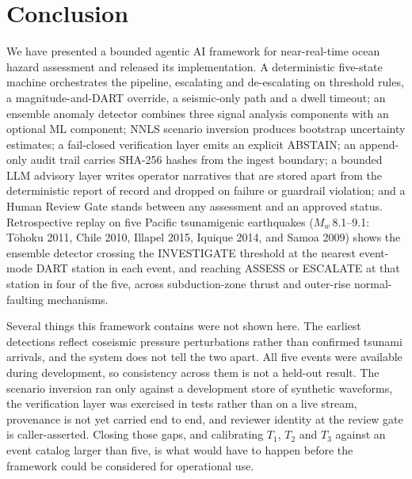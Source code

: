 \documentclass{article}
\begin{document}

\section{Conclusion}

We have presented a bounded agentic AI framework for near-real-time
ocean hazard assessment and released its implementation.  A
deterministic five-state machine orchestrates the pipeline, escalating
and de-escalating on threshold rules, a magnitude-and-DART override, a
seismic-only path and a dwell timeout; an ensemble anomaly
detector combines three signal analysis components with an optional ML
component; NNLS scenario inversion produces bootstrap uncertainty
estimates; a fail-closed verification layer emits an explicit ABSTAIN;
an append-only audit trail carries SHA-256 hashes from the ingest
boundary; a bounded LLM advisory layer writes operator narratives that
are stored apart from the deterministic report of record and dropped
on failure or guardrail violation; and a Human Review Gate stands
between any assessment and an approved status.  Retrospective replay
on five Pacific tsunamigenic earthquakes ($M_w$\,8.1--9.1:
T\={o}hoku 2011, Chile 2010, Illapel 2015, Iquique 2014, and Samoa
2009) shows the ensemble detector crossing the INVESTIGATE threshold at the
nearest event-mode DART station in each event, and reaching ASSESS or
ESCALATE at that station in four of the five, across subduction-zone
thrust and outer-rise normal-faulting mechanisms.

Several things this framework contains were not shown here.  The
earliest detections reflect coseismic pressure perturbations rather
than confirmed tsunami arrivals, and the system does not tell the two
apart.  All five events were available during development, so
consistency across them is not a held-out result.  The scenario
inversion ran only against a development store of synthetic waveforms,
the verification layer was exercised in tests rather than on a live
stream, provenance is not yet carried end to end, and reviewer
identity at the review gate is caller-asserted.  Closing those gaps,
and calibrating $T_1$, $T_2$ and $T_3$ against an event catalog larger
than five, is what would have to happen before the framework could be
considered for operational use.

\end{document}
